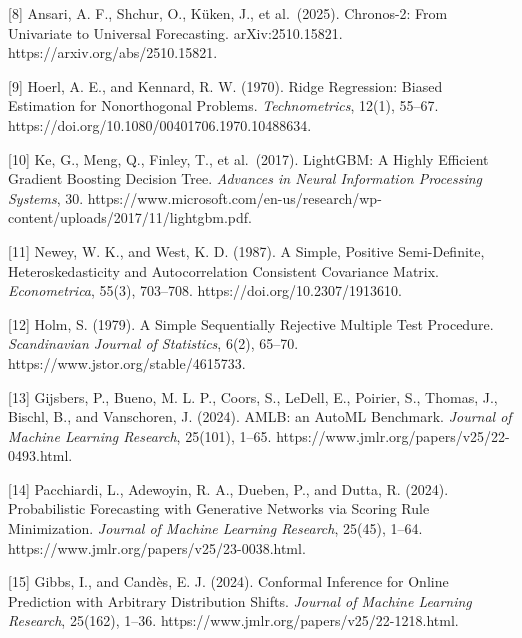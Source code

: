 {[}8{]} Ansari, A. F., Shchur, O., Küken, J., et al.~(2025). Chronos-2:
From Univariate to Universal Forecasting. arXiv:2510.15821.
https://arxiv.org/abs/2510.15821.

{[}9{]} Hoerl, A. E., and Kennard, R. W. (1970). Ridge Regression:
Biased Estimation for Nonorthogonal Problems. \emph{Technometrics},
12(1), 55--67. https://doi.org/10.1080/00401706.1970.10488634.

{[}10{]} Ke, G., Meng, Q., Finley, T., et al.~(2017). LightGBM: A Highly
Efficient Gradient Boosting Decision Tree. \emph{Advances in Neural
Information Processing Systems}, 30.
https://www.microsoft.com/en-us/research/wp-content/uploads/2017/11/lightgbm.pdf.

{[}11{]} Newey, W. K., and West, K. D. (1987). A Simple, Positive
Semi-Definite, Heteroskedasticity and Autocorrelation Consistent
Covariance Matrix. \emph{Econometrica}, 55(3), 703--708.
https://doi.org/10.2307/1913610.

{[}12{]} Holm, S. (1979). A Simple Sequentially Rejective Multiple Test
Procedure. \emph{Scandinavian Journal of Statistics}, 6(2), 65--70.
https://www.jstor.org/stable/4615733.

{[}13{]} Gijsbers, P., Bueno, M. L. P., Coors, S., LeDell, E., Poirier,
S., Thomas, J., Bischl, B., and Vanschoren, J. (2024). AMLB: an AutoML
Benchmark. \emph{Journal of Machine Learning Research}, 25(101), 1--65.
https://www.jmlr.org/papers/v25/22-0493.html.

{[}14{]} Pacchiardi, L., Adewoyin, R. A., Dueben, P., and Dutta, R.
(2024). Probabilistic Forecasting with Generative Networks via Scoring
Rule Minimization. \emph{Journal of Machine Learning Research}, 25(45),
1--64. https://www.jmlr.org/papers/v25/23-0038.html.

{[}15{]} Gibbs, I., and Candès, E. J. (2024). Conformal Inference for
Online Prediction with Arbitrary Distribution Shifts. \emph{Journal of
Machine Learning Research}, 25(162), 1--36.
https://www.jmlr.org/papers/v25/22-1218.html.

\endgroup
